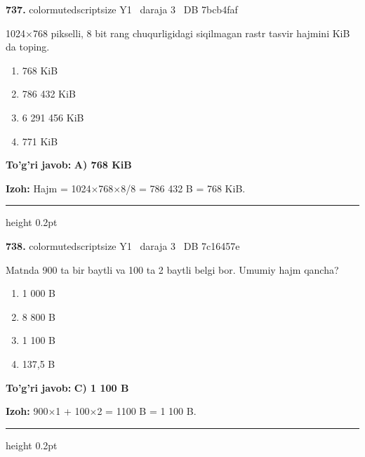 \documentclass[10pt,a4paper,oneside]{article}
\begin{document}
\noindent\textbf{\color{ink}737.}  {color{muted}scriptsize Y1 \textbullet\ daraja 3 \textbullet\ DB 7bcb4faf}
\par
1024\ensuremath{\times}768 pikselli, 8 bit rang chuqurligidagi siqilmagan rastr tasvir hajmini KiB da toping.
\begin{enumerate}[label=\Alph*),leftmargin=9mm]
\item 768 KiB
\item 786 432 KiB
\item 6 291 456 KiB
\item 771 KiB
\end{enumerate}
\begin{tcolorbox}[enhanced,breakable,colback=teal!4,colframe=teal!50!black,boxrule=0.5pt,arc=1.1mm,left=3mm,right=3mm,top=1.7mm,bottom=1.7mm,before skip=2mm,after skip=2mm]
\textbf{\color{teal}To'g'ri javob:} \textbf{A) 768 KiB}
\par\smallskip
\textbf{Izoh:} Hajm = 1024\ensuremath{\times}768\ensuremath{\times}8/8 = 786 432 B = 768 KiB.
\end{tcolorbox}
\vspace{2mm}\hrule height 0.2pt \vspace{3mm}

\noindent\textbf{\color{ink}738.}  {color{muted}scriptsize Y1 \textbullet\ daraja 3 \textbullet\ DB 7c16457e}
\par
Matnda 900 ta bir baytli va 100 ta 2 baytli belgi bor. Umumiy hajm qancha?
\begin{enumerate}[label=\Alph*),leftmargin=9mm]
\item 1 000 B
\item 8 800 B
\item 1 100 B
\item 137,5 B
\end{enumerate}
\begin{tcolorbox}[enhanced,breakable,colback=teal!4,colframe=teal!50!black,boxrule=0.5pt,arc=1.1mm,left=3mm,right=3mm,top=1.7mm,bottom=1.7mm,before skip=2mm,after skip=2mm]
\textbf{\color{teal}To'g'ri javob:} \textbf{C) 1 100 B}
\par\smallskip
\textbf{Izoh:} 900\ensuremath{\times}1 + 100\ensuremath{\times}2 = 1100 B = 1 100 B.
\end{tcolorbox}
\vspace{2mm}\hrule height 0.2pt \vspace{3mm}
\end{document}
